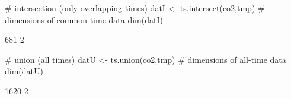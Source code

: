 \begin{Schunk}
\begin{Sinput}
 # intersection (only overlapping times)
 datI <- ts.intersect(co2,tmp)
 # dimensions of common-time data
 dim(datI)
\end{Sinput}
\begin{Soutput}
[1] 681   2
\end{Soutput}
\begin{Sinput}
 # union (all times)
 datU <- ts.union(co2,tmp)
 # dimensions of all-time data
 dim(datU)
\end{Sinput}
\begin{Soutput}
[1] 1620    2
\end{Soutput}
\end{Schunk}
